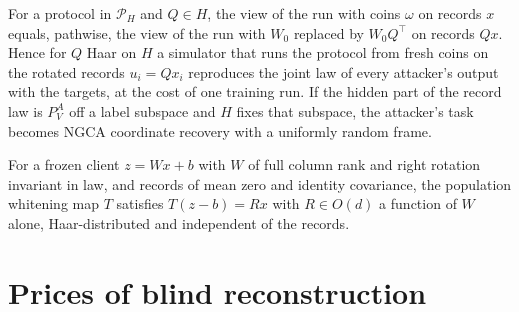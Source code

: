 \begin{lemma}
For a protocol in $\mathcal P_H$ and $Q\in H$, the view of the run with coins
$\omega$ on records $x$ equals, pathwise, the view of the run with $W_0$ replaced by
$W_0Q^\top$ on records $Qx$. Hence for $Q$ Haar on $H$ a simulator that runs the
protocol from fresh coins on the rotated records $u_i=Qx_i$ reproduces the joint
law of every attacker's output with the targets, at the cost of one training run.
If the hidden part of the record law is $P^A_V$ off a label subspace and $H$ fixes
that subspace, the attacker's task becomes NGCA coordinate recovery with a
uniformly random frame.
\end{lemma}

\begin{lemma}
For a frozen client $z=Wx+b$ with $W$ of full column rank and right rotation
invariant in law, and records of mean zero and identity covariance, the population
whitening map $T$ satisfies $T(z-b)=Rx$ with $R\in O(d)$ a function of $W$ alone,
Haar-distributed and independent of the records.
\end{lemma}

\section{Prices of blind reconstruction}

